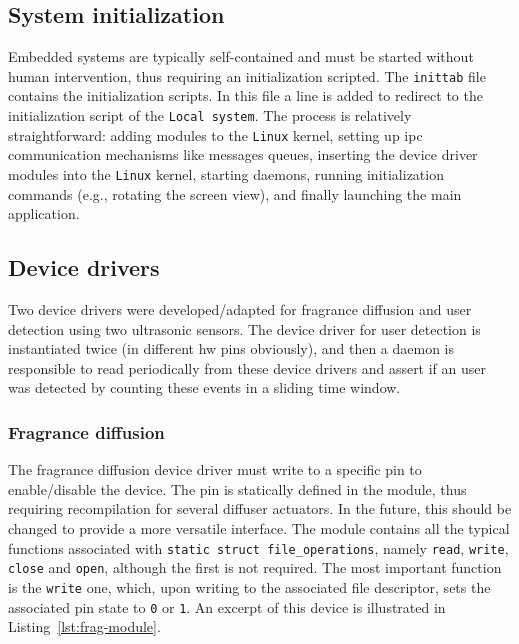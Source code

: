 \subsection{System initialization}
\label{sec:syst-init}
Embedded systems are typically self-contained and must be started without human
intervention, thus requiring an initialization scripted. The \texttt{inittab}
file contains the initialization scripts. In this file a line is added to
redirect to the initialization script of the \texttt{Local system}.
The process is relatively straightforward: adding modules to the \texttt{Linux}
kernel, setting up \gls{ipc} communication mechanisms like messages queues,
inserting the device driver modules into the \texttt{Linux} kernel, starting
daemons, running initialization commands (e.g., rotating the screen view), and
finally launching the main application.



\subsection{Device drivers}
\label{sec:device-drivers-1}
Two device drivers were developed/adapted for fragrance diffusion and user
detection using two ultrasonic sensors. The device driver for user detection is
instantiated twice (in different \gls{hw} pins obviously), and then a daemon is
responsible to read periodically from these device drivers and assert if an user
was detected by counting these events in a sliding time window.

\subsubsection{Fragrance diffusion}
\label{sec:fragrance-diffusion}
The fragrance diffusion device driver must write to a specific pin to
enable/disable the device. The pin is statically defined in the module, thus
requiring recompilation for several diffuser actuators. In the future, this
should be changed to provide a more versatile interface. The module contains all
the typical functions associated with \texttt{static struct file\_operations},
namely \texttt{read}, \texttt{write}, \texttt{close} and \texttt{open}, although
the first is not required. The most important function is the \texttt{write}
one, which, upon writing to the associated file descriptor, sets the associated
pin state to \texttt{0} or \texttt{1}.
An excerpt of this device is illustrated
in Listing~\ref{lst:frag-module}.

